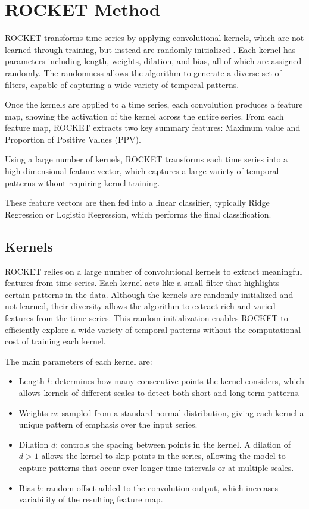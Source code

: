 \section{ROCKET Method}
\label{sec:rocket}
ROCKET transforms time series by applying convolutional kernels, which are not learned through training, but instead are randomly initialized \cite{dempster2020rocket}. Each kernel has parameters including length, weights, dilation, and bias, all of which are assigned randomly. The randomness allows the algorithm to generate a diverse set of filters, capable of capturing a wide variety of temporal patterns.

Once the kernels are applied to a time series, each convolution produces a feature map, showing the activation of the kernel across the entire series. From each feature map, ROCKET extracts two key summary features: Maximum value and Proportion of Positive Values (PPV).

Using a large number of kernels, ROCKET transforms each time series into a high-dimensional feature vector, which captures a large variety of temporal patterns without requiring kernel training.

These feature vectors are then fed into a linear classifier, typically Ridge Regression or Logistic Regression, which performs the final classification.

\subsection{Kernels}
ROCKET relies on a large number of convolutional kernels to extract meaningful features from time series. Each kernel acts like a small filter that highlights certain patterns in the data. Although the kernels are randomly initialized and not learned, their diversity allows the algorithm to extract rich and varied features from the time series. This random initialization enables ROCKET to efficiently explore a wide variety of temporal patterns without the computational cost of training each kernel.

The main parameters of each kernel are:
\begin{itemize}
    \item Length $l$: determines how many consecutive points the kernel considers, which allows kernels of different scales to detect both short and long-term patterns.
    \item Weights $w$: sampled from a standard normal distribution, giving each kernel a unique pattern of emphasis over the input series.
    \item Dilation $d$: controls the spacing between points in the kernel. A dilation of $d > 1$ allows the kernel to skip points in the series, allowing the model to capture patterns that occur over longer time intervals or at multiple scales.
    \item Bias $b$: random offset added to the convolution output, which increases variability of the resulting feature map.
\end{itemize}

